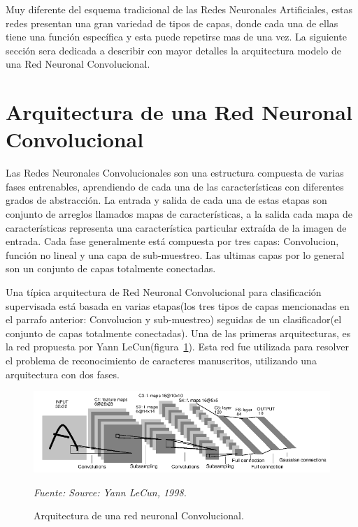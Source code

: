 Muy diferente del esquema tradicional de las Redes Neuronales Artificiales, estas redes presentan una gran variedad de tipos de capas, donde cada una de ellas tiene una función específica y esta puede repetirse mas de una vez. La siguiente sección sera dedicada a describir con mayor detalles la arquitectura modelo de una Red Neuronal Convolucional.

\section{Arquitectura de una Red Neuronal Convolucional}

Las Redes Neuronales Convolucionales son una estructura compuesta de varias fases entrenables, aprendiendo de cada una de las características con diferentes grados de abstracción. La entrada y salida de cada una de estas etapas son conjunto de arreglos llamados mapas de características, a la salida cada mapa de características representa una característica particular extraída de la imagen de entrada. Cada fase generalmente está compuesta por tres capas: Convolucion, función no lineal y una capa de sub-muestreo. Las ultimas capas por lo general son un conjunto de capas totalmente conectadas.

Una típica arquitectura de Red Neuronal Convolucional para clasificación supervisada está basada en varias etapas(los tres tipos de capas mencionadas en el parrafo anterior: Convolucion y sub-muestreo) seguidas de un clasificador(el conjunto de capas totalmente conectadas). Una de las primeras arquitecturas, es la red propuesta por Yann LeCun(figura~\ref{fig:arquitectura_CNN_Lecun}). Esta red fue utilizada para resolver el problema de reconocimiento de caracteres manuscritos, utilizando una arquitectura con dos fases.


\begin{figure}[H]
		\centering
		\includegraphics[width=160mm]{Imagenes/arquitectura_CNN_Lecun.png}
		\caption{Arquitectura de una red neuronal Convolucional.}
		\vspace{0.15cm}
		\textit{Fuente: Source: Yann LeCun, 1998.}
		\label{fig:arquitectura_CNN_Lecun}
\end{figure}

